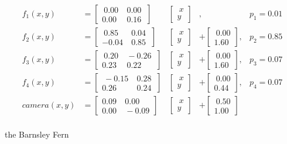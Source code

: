 \documentclass[11pt]{article}
\begin{document}
\begin{ifs}
$$ 
\begin{aligned}
f_1(x,y) &= \begin{bmatrix} \ 0.00 & \ 0.00 \ \\ 0.00 & \ 0.16 \end{bmatrix}  & \begin{bmatrix} \ x \\ y \end{bmatrix} & , &p_1 = 0.01 \\
f_2(x,y) &= \begin{bmatrix} \ 0.85 & \ 0.04 \ \\ -0.04 & \ 0.85 \end{bmatrix} & \begin{bmatrix} \ x \\ y \end{bmatrix} &+ \begin{bmatrix} \ 0.00 \\ 1.60 \end{bmatrix} , &p_2 = 0.85 \\
f_3(x,y) &= \begin{bmatrix} \ 0.20 & \ -0.26 \ \\ 0.23 & \ 0.22 \end{bmatrix} & \begin{bmatrix} \ x \\ y \end{bmatrix} &+ \begin{bmatrix} \ 0.00 \\ 1.60 \end{bmatrix} , &p_3 = 0.07 \\
f_4(x,y) &= \begin{bmatrix} \ -0.15 & \ 0.28 \ \\ 0.26 & \ 0.24 \end{bmatrix} & \begin{bmatrix} \ x \\ y \end{bmatrix} &+ \begin{bmatrix} \ 0.00 \\ 0.44 \end{bmatrix} , &p_4 = 0.07 \\
camera(x, y) &= \begin{bmatrix} 0.09 & \ 0.00 \\ 0.00 & \ -0.09 \end{bmatrix} & \begin{bmatrix} \ x \\ y \end{bmatrix} &+ \begin{bmatrix} \ 0.50 \\ 1.00 \end{bmatrix} \\
\end{aligned}
$$
\caption{the Barnsley Fern}
\label{ifs:barnsley_fern}
\end{ifs}
\end{document}
